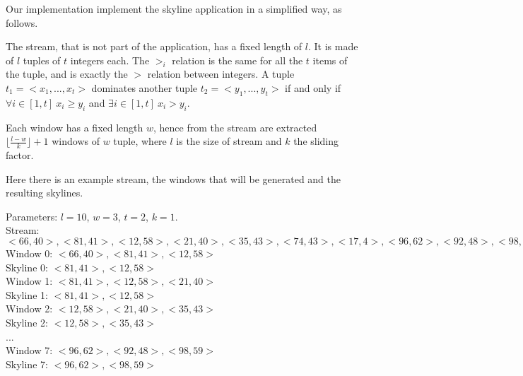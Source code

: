 \bigskip\noindent
Our implementation implement the skyline application in a simplified way, as follows.

The stream, that is not part of the application, has a fixed length of $l$. It is made of $l$ tuples of $t$ integers each. The $>_i$ relation is the same for all the $t$ items of the tuple, and is exactly the $>$ relation between integers. A tuple $t_1 = <x_1, ... , x_t>$ dominates another tuple $t_2 = <y_1, ... , y_t>$ if and only if $\forall i \in [1, t] \ x_i \geq y_i$ and $\exists i \in [1, t] \ x_i > y_i$.

Each window has a fixed length $w$, hence from the stream are extracted $\lfloor\frac{l-w}{k}\rfloor+1$ windows of $w$ tuple, where $l$ is the size of stream and $k$ the sliding factor.

\bigskip\noindent
Here there is an example stream, the windows that will be generated and the resulting skylines.

\medskip\noindent
Parameters: $l = 10$, $w = 3$, $t = 2$, $k = 1$. \medskip \\
Stream: $<66,40>, <81,41>, <12,58>, <21,40>, <35,43>, <74,43>, <17,4>, <96,62>, <92,48>, <98,59>$ \medskip \\
Window 0: $<66,40>, <81,41>, <12,58>$ \\
Skyline 0: $<81,41>, <12,58>$ \medskip \\
Window 1: $<81,41>, <12,58>, <21,40>$ \\
Skyline 1: $<81,41>, <12,58>$ \medskip \\
Window 2: $<12,58>, <21,40>, <35,43>$ \\
Skyline 2: $<12,58>, <35,43>$ \smallskip \\
... \smallskip \\
Window 7: $<96,62>, <92,48>, <98,59>$ \\
Skyline 7: $<96,62>, <98,59>$
